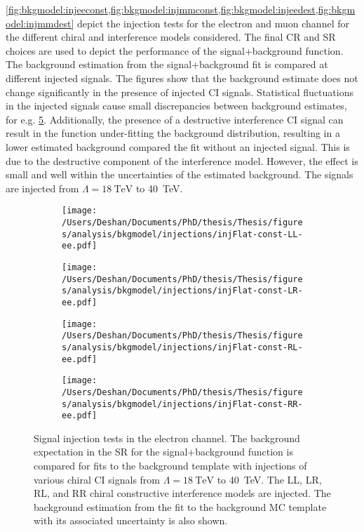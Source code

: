 \cref{fig:bkgmodel:injeeconst,fig:bkgmodel:injmmconst,fig:bkgmodel:injeedest,fig:bkgmodel:injmmdest} depict the injection tests for the electron and muon channel for the different chiral and interference models considered. The final CR and SR choices are used to depict the performance of the signal+background function. The background estimation from the signal+background fit is compared at different injected signals. The figures show that the background estimate does not change significantly in the presence of injected CI signals. Statistical fluctuations in the injected signals cause small discrepancies between background estimates, for e.g. \cref{fig:bkgmodel:injeeconst}. Additionally, the presence of a destructive interference CI signal can result in the function under-fitting the background distribution, resulting in a lower estimated background compared the fit without an injected signal. This is due to the destructive component of the interference model. However, the effect is small and well within the uncertainties of the estimated background. The signals are injected from $\Lambda = \SI{18}{\tera\electronvolt}$ to \SI{40}{\tera\electronvolt}. 

\begin{figure}[h!]
    \centering
    \begin{subfigure}[b]{0.49\textwidth}
        \centering
        \texttt{[image: /Users/Deshan/Documents/PhD/thesis/Thesis/figures/analysis/bkgmodel/injections/injFlat-const-LL-ee.pdf]}
        \label{fig:bkgmodel:injee1}
    \end{subfigure}
    \begin{subfigure}[b]{0.49\textwidth}
        \centering
        \texttt{[image: /Users/Deshan/Documents/PhD/thesis/Thesis/figures/analysis/bkgmodel/injections/injFlat-const-LR-ee.pdf]}
        \label{fig:bkgmodel:injee3}
    \end{subfigure}
    \begin{subfigure}[b]{0.49\textwidth}
        \centering
        \texttt{[image: /Users/Deshan/Documents/PhD/thesis/Thesis/figures/analysis/bkgmodel/injections/injFlat-const-RL-ee.pdf]}
        \label{fig:bkgmodel:injee5}
    \end{subfigure}
    \begin{subfigure}[b]{0.49\textwidth}
        \centering
        \texttt{[image: /Users/Deshan/Documents/PhD/thesis/Thesis/figures/analysis/bkgmodel/injections/injFlat-const-RR-ee.pdf]}
        \label{fig:bkgmodel:injee7}
    \end{subfigure}
    \caption[Signal injection tests in the electron channel for constructive interference models]{Signal injection tests in the electron channel. The background expectation in the SR for the signal+background function is compared for fits to the background template with injections of various chiral CI signals from $\Lambda = \SI{18}{\tera\electronvolt}$ to \SI{40}{\tera\electronvolt}. The LL, LR, RL, and RR chiral constructive interference models are injected. The background estimation from the fit to the background MC template with its associated uncertainty is also shown.}
    \label{fig:bkgmodel:injeeconst}
\end{figure}

